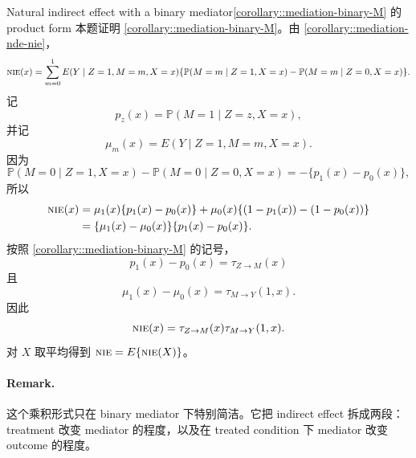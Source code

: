 \begin{exercisesolution}{Natural indirect effect with a binary mediator}{\cref{corollary::mediation-binary-M} 的 product form}
本题证明 \cref{corollary::mediation-binary-M}。由 \cref{corollary::mediation-nde-nie}，
\[
\textsc{nie}(x)
=
\sum_{m=0}^1 E(Y\mid Z=1,M=m,X=x)
\{\mathbb{P}(M=m\mid Z=1,X=x)-\mathbb{P}(M=m\mid Z=0,X=x)\}.
\]
记
\[
p_z(x)=\mathbb{P}(M=1\mid Z=z,X=x),
\]
并记
\[
\mu_m(x)=E(Y\mid Z=1,M=m,X=x).
\]
因为
\[
\mathbb{P}(M=0\mid Z=1,X=x)-\mathbb{P}(M=0\mid Z=0,X=x)
=
-\{p_1(x)-p_0(x)\},
\]
所以
\begin{align*}
\textsc{nie}(x)
&=
\mu_1(x)\{p_1(x)-p_0(x)\}
+\mu_0(x)\{(1-p_1(x))-(1-p_0(x))\}\\
&=
\{\mu_1(x)-\mu_0(x)\}\{p_1(x)-p_0(x)\}.
\end{align*}
按照 \cref{corollary::mediation-binary-M} 的记号，
\[
p_1(x)-p_0(x)=\tau_{Z\rightarrow M}(x)
\]
且
\[
\mu_1(x)-\mu_0(x)=\tau_{M\rightarrow Y}(1,x).
\]
因此
\[
\textsc{nie}(x)=\tau_{Z\rightarrow M}(x)\tau_{M\rightarrow Y}(1,x).
\]
对 $X$ 取平均得到 $\textsc{nie}=E\{\textsc{nie}(X)\}$。

\paragraph{Remark.}
这个乘积形式只在 binary mediator 下特别简洁。它把 indirect effect 拆成两段：treatment 改变 mediator 的程度，以及在 treated condition 下 mediator 改变 outcome 的程度。
\end{exercisesolution}


